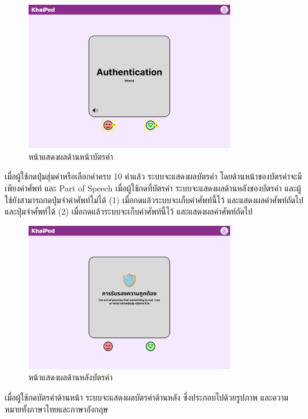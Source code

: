 \documentclass[12pt,oneside,openright,a4paper]{cpe-thai-project}
\begin{document}
\begin{figure}[!h]\centering
	\includegraphics[width=0.8\textwidth, keepaspectratio=true]{image/chap3/ui/flashcard/Flashcard - Show Card.png}
	\caption{หน้าแสดงผลด้านหน้าบัตรคำ}\label{fig:UI_ShowCard}
\end{figure}
\hspace{1cm}
เมื่อผู้ใช้กดปุ่มสุ่มคำหรือเลือกคำครบ 10 คำแล้ว ระบบจะแสดงผลบัตรคำ โดยด้านหน้าของบัตรคำจะมีเพียงคำศัพท์ และ Part of Speech เมื่อผู้ใช้กดที่บัตรคำ
ระบบจะแสดงผลด้านหลังของบัตรคำ และผู้ใช้ยังสามารถกดปุ่มจำคำศัพท์ไม่ได้ (1) เมื่อกดแล้วระบบจะเก็บคำศัพท์นี้ไว้ และแสดงผลคำศัพท์ถัดไป และปุ่มจำศัพท์ได้ (2)
เมื่อกดแล้วระบบจะเก็บคำศัพท์นี้ไว้ และแสดงผลคำศัพท์ถัดไป

\pagebreak
\begin{figure}[!h]\centering
	\includegraphics[width=0.8\textwidth, keepaspectratio=true]{image/chap3/ui/flashcard/Flashcard - Flip Card.png}
	\caption{หน้าแสดงผลด้านหลังบัตรคำ}\label{fig:UI_FlipCard}
\end{figure}
\hspace{1cm}
เมื่อผู้ใช้กดบัตรคำด้านหน้า ระบบจะแสดงผลบัตรคำด้านหลัง ซึ่งประกอบไปด้วยรูปภาพ และความหมายทั้งภาษาไทยและภาษาอังกฤษ
\end{document}
